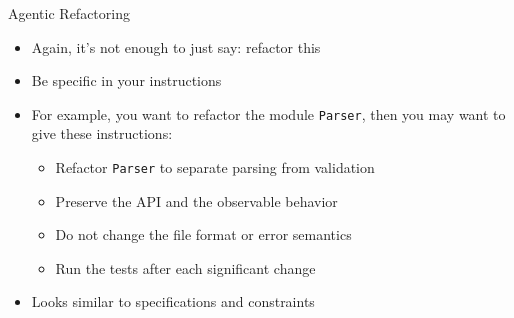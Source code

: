 \documentclass[
ps,
]{prosper}
\begin{document}
\begin{slide}{Agentic Refactoring}

\begin{itemize}

\item Again, it's not enough to just say: refactor this

\item Be specific in your instructions

\item For example, you want to refactor the module \texttt{Parser}, then you
  may want to give these instructions:

  \begin{itemize}
    
  \item Refactor \texttt{Parser} to separate parsing from validation

  \item Preserve the API and the observable behavior

  \item Do not change the file format or error semantics

  \item Run the tests after each significant change
    
  \end{itemize}

\item Looks similar to specifications and constraints
  
\end{itemize}
  
\end{slide}
\end{document}
